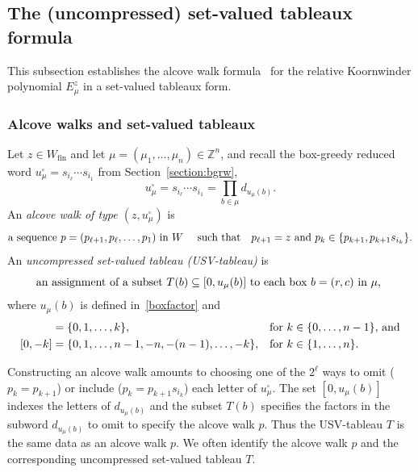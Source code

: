 \documentclass[11pt]{article}
\theoremstyle{plain}
\theoremstyle{definition}
\theoremstyle{remark}
\numberwithin{equation}{section}
\def\ZZ{\mathbb{Z}}
\newcounter{r}
\newcounter{s}
\begin{document}
\subsection{The (uncompressed) set-valued tableaux formula}
\label{section:usvtableaux}

This subsection establishes the alcove walk formula~\cite[Theorem 3.1]{RY08} for the relative Koornwinder polynomial $E^z_\mu$ 
in a set-valued tableaux form.

\subsubsection{Alcove walks and set-valued tableaux}

Let $z\in W_{\mathrm{fin}}$ and let $\mu = (\mu_1, \ldots ,\mu_n)\in \ZZ^n$, and recall the box-greedy reduced word 
$u^\square_\mu = s_{i_\ell}\cdots s_{i_1}$ from Section~\ref{section:bgrw}, 
$$u_\mu^\square = s_{i_\ell}\cdots s_{i_1} = \prod_{b\in \mu} d_{u_\mu(b)}.
$$
An \emph{alcove walk 
of type $(z, u^\square_\mu)$} is 
$$
\hbox{a sequence $p=(p_{\ell+1},p_\ell, \ldots, p_1)$ in $W$ \quad such that\quad
$p_{\ell+1} = z$ and $p_k\in \{ p_{k+1}, p_{k+1}s_{i_k}\}$.}
$$
An \emph{uncompressed set-valued tableau (USV-tableau)} is 
\begin{equation}
\hbox{an assignment of a subset $T(b)\subseteq [0,u_\mu(b)]$ to each box $b=(r,c)$ in $\mu$, }
\label{USVdef}
\end{equation}
where $u_\mu(b)$ is defined in~\eqref{boxfactor} and
\begin{align*}
[0,k] &= \{0,1,\ldots, k\}, &&\hbox{for $k\in \{0, \ldots, n-1\}$, and}
\\
[0, -k] &= \{0,1,\ldots, n-1, -n, -(n-1), \ldots, -k\}, &&\hbox{for $k\in \{1,\ldots, n\}$.}
\end{align*}

Constructing an alcove walk amounts to choosing one of the  $2^\ell$ ways to 
omit ($p_{k} = p_{k+1}$) or include ($p_{k} = p_{k+1}s_{i_{k}}$) each letter of $u_{\mu}^{\square}$.
The set $[0, u_\mu(b)]$ indexes the letters of $d_{u_\mu(b)}$ and the subset $T(b)$ specifies the factors in the subword $d_{u_{\mu}(b)}$ to omit to specify the alcove walk $p$.  Thus the USV-tableau $T$ is the same data as an alcove walk $p$.  We often identify the
alcove walk $p$ and the corresponding uncompressed set-valued tableau $T$.
\end{document}
